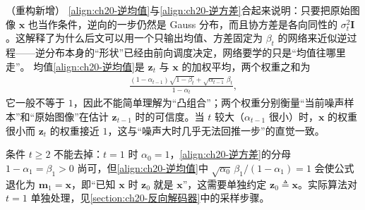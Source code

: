 \documentclass[../../main.tex]{subfiles}
\begin{document}
\begin{remark}（重构新增）
\eqref{align:ch20-逆均值}与\eqref{align:ch20-逆方差}合起来说明：只要把原始图像 $\bm{x}$ 也当作条件，逆向的一步仍然是 Gauss 分布，而且协方差是各向同性的 $\sigma_t^2\bm{I}$。这解释了为什么后文可以用一个只输出均值、方差固定为 $\beta_t$ 的网络来近似逆过程——逆分布本身的“形状”已经由前向调度决定，网络要学的只是“均值往哪里走”。
均值\eqref{align:ch20-逆均值}是 $\bm{z}_t$ 与 $\bm{x}$ 的加权平均，两个权重之和为
\begin{align*}
\frac{(1-\alpha_{t-1})\sqrt{1-\beta_t}+\sqrt{\alpha_{t-1}}\,\beta_t}{1-\alpha_t},
\end{align*}
它一般不等于 $1$，因此不能简单理解为“凸组合”；两个权重分别衡量“当前噪声样本”和“原始图像”在估计 $\bm{z}_{t-1}$ 时的可信度。当 $t$ 较大（$\alpha_{t-1}$ 很小）时，$\bm{x}$ 的权重很小而 $\bm{z}_t$ 的权重接近 $1$，这与“噪声大时几乎无法回推一步”的直觉一致。\par
条件 $t\geqslant2$ 不能去掉：$t=1$ 时 $\alpha_0=1$，\eqref{align:ch20-逆方差}的分母 $1-\alpha_1=\beta_1>0$ 尚可，但\eqref{align:ch20-逆均值}中 $\sqrt{\alpha_0}\,\beta_1/(1-\alpha_1)=1$ 会使公式退化为 $\bm{m}_1=\bm{x}$，即“已知 $\bm{x}$ 时 $\bm{z}_0$ 就是 $\bm{x}$”，这需要单独约定 $\bm{z}_0\triangleq\bm{x}$。实际算法对 $t=1$ 单独处理，见\cref{section:ch20-反向解码器}中的采样步骤。
\end{remark}
\end{document}
